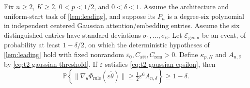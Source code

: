 \begin{lemma}
\label{lem:quant-rule-gradient}
Fix $n\ge2$, $K\ge2$, $0<p<1/2$, and $0<\delta<1$.
Assume the architecture and uniform-start task of \cref{lem:leading}, and suppose its $P_n$ is a degree-six polynomial in
independent centered Gaussian attention/embedding entries.  Assume the six
distinguished entries have standard deviations $\sigma_1,\ldots,\sigma_6$.
Let $\mathcal E_{\mathrm{geom}}$ be an event, of probability at least
$1-\delta/2$, on which the deterministic hypotheses of \cref{lem:leading} hold with
fixed nonrandom $\varepsilon_0,C_{\mathrm{att}},C_{\mathrm{rem}}>0$.
Define $\kappa_{p,K}$ and $A_{n,\delta}$ by
\eqref{eq:t2-gaussian-threshold}.  If $\varepsilon$ satisfies
\eqref{eq:t2-gaussian-epsilon}, then
\begin{equation}
 \mathbb P\!\left\{
  \|\nabla_\theta\Phi_{\mathrm{rule}}
     (\varepsilon\widetilde\theta)\|
       \ge\tfrac12\varepsilon^6 A_{n,\delta}
 \right\}\ge1-\delta.
 \label{eq:quant-rule-gradient}
\end{equation}
\end{lemma}
